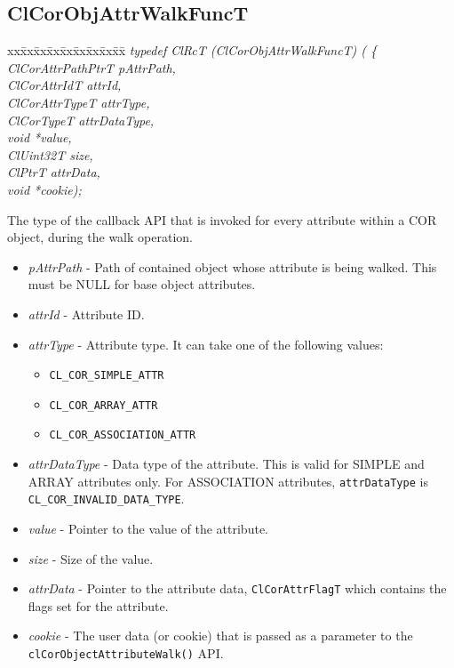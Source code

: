 \begin{flushleft}
\subsection{ClCorObjAttrWalkFuncT}
\begin{tabbing}
xx\=xx\=xx\=xx\=xx\=xx\=xx\=xx\=xx\=\kill
\textit{typedef ClRcT (ClCorObjAttrWalkFuncT) ( \{}\\
\>\>\>\>\textit{ClCorAttrPathPtrT pAttrPath,}\\
\>\>\>\>\textit{ClCorAttrIdT attrId,}\\
\>\>\>\>\textit{ClCorAttrTypeT attrType,}\\
\>\>\>\>\textit{ClCorTypeT attrDataType,}\\
\>\>\>\>\textit{void *value,}\\
\>\>\>\>\textit{ClUint32T size,}\\
\>\>\>\>\textit{ClPtrT attrData,}\\
\>\>\>\>\textit{void *cookie);}\\
\end{tabbing}
 The type of the callback API that is invoked for every attribute within a COR object, during the walk operation.
 \begin{itemize}
 \item
 \textit{pAttrPath} - Path of contained object whose attribute is being walked. 
This must be NULL for base object attributes. \item
 \textit{attrId} - Attribute ID.
 \item
 \textit{attrType} - Attribute type. It can take one of the following values:
 \begin{itemize}
 \item
 {\tt{CL\_\-COR\_\-SIMPLE\_\-ATTR}}
 \item
 {\tt{CL\_\-COR\_\-ARRAY\_\-ATTR}}
 \item
 {\tt{CL\_\-COR\_\-ASSOCIATION\_\-ATTR}}
\end{itemize}
 \item
 \textit{attrDataType} - Data type of the attribute. This is valid for SIMPLE and ARRAY attributes only. For ASSOCIATION attributes, {\tt{attrDataType}}
 is
 {\tt{CL\_\-COR\_\-INVALID\_\-DATA\_\-TYPE}}.
 \item
 \textit{value} - Pointer to the value of the attribute.
 \item
 \textit{size} - Size of the value.
 \item
\textit{attrData} - Pointer to the attribute data, {\tt{ClCorAttrFlagT}} which contains the flags set for the attribute.
 \item
 \textit{cookie} - The user data (or cookie) that is passed as a parameter to the {\tt{clCorObjectAttributeWalk()}} API.
 \end{itemize}





\end{flushleft}
